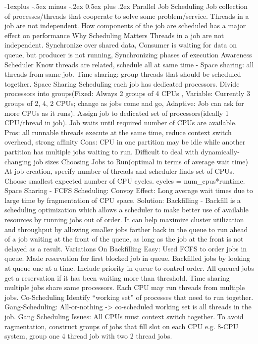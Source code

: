 \documentclass[10pt,landscape]{article}
\makeatletter
\renewcommand{\subsection}{\@startsection{subsection}{2}{0mm}%
                                {-1explus -.5ex minus -.2ex}%
                                {0.5ex plus .2ex}%
                                {\normalfont\normalsize\bfseries}}
\makeatother
\begin{document}
\raggedright
\footnotesize
\begin{multicols}{3}


\setlength{\premulticols}{1pt}
\setlength{\postmulticols}{1pt}
\setlength{\multicolsep}{1pt}
\setlength{\columnsep}{2pt}

\subsection{Parallel Job Scheduling}
Job collection of processes/threads that cooperate to solve some problem/service. Threads in a job are not independent. How components of the job are scheduled has a major effect on performance Why Scheduling Matters Threads in a job are not independent. Synchronize over shared data, Consumer is waiting for data on queue, but producer is not running, Synchronizing phases of execution  Awareness Scheduler  Know threads are related, schedule all at same time - Space sharing: all threads from same job. Time sharing: group threads that should be scheduled together.  Space Sharing Scheduling each job has dedicated processors. Divide processors into groups(Fixed: Always 2 groups of 4 CPUs , Variable: Currently 3 groups of 2, 4, 2 CPUs; change as jobs come and go, Adaptive: Job can ask for more CPUs as it runs). Assign job to dedicated set of processors(ideally 1 CPU/thread in job). Job waits until required number of CPUs are available. Pros: all runnable threads execute at the same time, reduce context switch overhead, strong affinity Cons: CPU in one partition may be idle while another partition has multiple jobs waiting to run. Difficult to deal with dynamically-changing job sizes  Choosing Jobs to Run(optimal in terms of average wait time) At job creation, specify number of threads and scheduler finds set of CPUs. Choose smallest expected number of CPU cycles. cycles = num_cpus*runtime. Space Sharing - FCFS Scheduling: Convoy Effect:  Long average wait times due to large time by fragmentation of CPU space. Solution: Backfilling - Backfill is a scheduling optimization which allows a scheduler to make better use of available resources by running jobs out of order. It can help maximize cluster utilization and throughput by allowing smaller jobs farther back in the queue to run ahead of a job waiting at the front of the queue, as long as the job at the front is not delayed as a result. Variations On Backfilling  Easy: Used FCFS to order jobs in queue. Made reservation for first blocked job in queue. Backfilled jobs by looking at queue one at a time. Include priority in queue to control order. All queued jobs get a reservation if it has been waiting more than threshold. Time sharing multiple jobs share same processors. Each CPU may run threads from multiple jobs. Co-Scheduling Identify “working set” of processes that need to run together. Gang-Scheduling: All-or-nothing -> co-scheduled working set is all threads in the job. Gang Scheduling Issues: All CPUs must context switch together. To avoid ragmentation, construct groups of jobs that fill slot on each CPU e.g. 8-CPU system, group one 4 thread job with two 2 thread jobs. 
\end{multicols}
\end{document}
